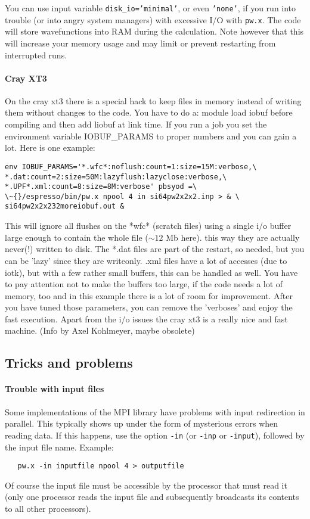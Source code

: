 \documentclass[12pt,a4paper]{article}
\def\pwx{\texttt{pw.x}}
\begin{document}
You can use input variable \texttt{disk\_io='minimal'}, or even 
\texttt{'none'}, if you run
into trouble (or into angry system managers) with excessive I/O with \pwx. 
The code will store wavefunctions into RAM during the calculation.
Note however that this will increase your memory usage and may limit 
or prevent restarting from interrupted runs.
\paragraph{Cray XT3}
On the cray xt3 there is a special hack to keep files in
memory instead of writing them without changes to the code.
You have to do a: 
module load iobuf
before compiling and then add liobuf at link time.
If you run a job you set the environment variable 
IOBUF\_PARAMS to proper numbers and you can gain a lot.
Here is one example:
\begin{verbatim}
env IOBUF_PARAMS='*.wfc*:noflush:count=1:size=15M:verbose,\
*.dat:count=2:size=50M:lazyflush:lazyclose:verbose,\
*.UPF*.xml:count=8:size=8M:verbose' pbsyod =\
\~{}/espresso/bin/pw.x npool 4 in si64pw2x2x2.inp > & \
si64pw2x2x232moreiobuf.out &
\end{verbatim}
This will ignore all flushes on the *wfc* (scratch files) using a
single i/o buffer large enough to contain the whole file ($\sim 12$ Mb here).
this way they are actually never(!) written to disk.
The *.dat files are part of the restart, so needed, but you can be
'lazy' since they are writeonly. .xml files have a lot of accesses
(due to iotk), but with a few rather small buffers, this can be
handled as well. You have to pay attention not to make the buffers
too large, if the code needs a lot of memory, too and in this example
there is a lot of room for improvement. After you have tuned those
parameters, you can remove the 'verboses' and enjoy the fast execution.
Apart from the i/o issues the cray xt3 is a really nice and fast machine.
(Info by Axel Kohlmeyer, maybe obsolete)

\subsection{Tricks and problems}

\paragraph{Trouble with input files}
Some implementations of the MPI library have problems with input 
redirection in parallel. This typically shows up under the form of
mysterious errors when reading data. If this happens, use the option 
\texttt{-in} (or \texttt{-inp} or \texttt{-input}), followed by the input file name. 
Example:
\begin{verbatim}
   pw.x -in inputfile npool 4 > outputfile
\end{verbatim} 
Of course the 
input file must be accessible by the processor that must read it
(only one processor reads the input file and subsequently broadcasts
its contents to all other processors).
\end{document}
